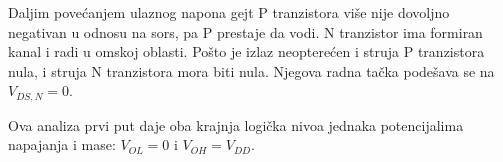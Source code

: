 Daljim povećanjem ulaznog napona gejt P tranzistora više nije dovoljno negativan u odnosu na sors, pa P prestaje da vodi. N tranzistor ima formiran kanal i radi u omskoj oblasti. Pošto je izlaz neopterećen i struja P tranzistora nula, i struja N tranzistora mora biti nula. Njegova radna tačka podešava se na $V_{DS,N}=0$.

Ova analiza prvi put daje oba krajnja logička nivoa jednaka potencijalima napajanja i mase: $V_{OL}=0$ i $V_{OH}=V_{DD}$.
